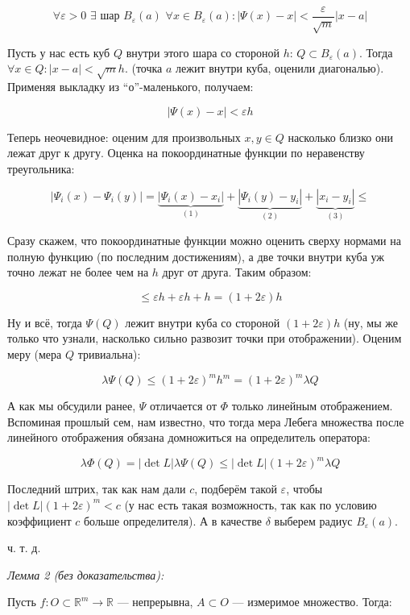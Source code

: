 \documentclass{article}
\def\dbl{\,\,}
\begin{document}
\[\forall \varepsilon > 0 \dbl \exists \text{ шар } B_{\varepsilon}(a) \dbl \forall x \in B_{\varepsilon}(a): |\Psi(x) - x| < \frac{\varepsilon}{\sqrt{m}}|x - a|\]

Пусть у нас есть куб $Q$ внутри этого шара со стороной $h$: $Q \subset B_{\varepsilon}(a)$. Тогда $\forall x \in Q: |x - a| < \sqrt{m}h$. (точка $a$ лежит внутри куба, оценили диагональю). Применяя выкладку из ``о''-маленького, получаем:

\[|\Psi(x) - x| < \varepsilon h\]

Теперь неочевидное: оценим для произвольных $x, y \in Q$ насколько близко они лежат друг к другу. Оценка на покоординатные функции по неравенству треугольника:

\[|\Psi_i(x) - \Psi_i(y)| = \underbrace{|\Psi_i(x) - x_i|}_{(1)} + \underbrace{|\Psi_i(y) - y_i|}_{(2)} + \underbrace{|x_i - y_i|}_{(3)} \le\]

Сразу скажем, что покоординатные функции можно оценить сверху нормами на полную функцию (по последним достижениям), а две точки внутри куба уж точно лежат не более чем на $h$ друг от друга. Таким образом:

\[\le \varepsilon h + \varepsilon h + h = (1 + 2\varepsilon) h \]

Ну и всё, тогда $\Psi(Q)$ лежит внутри куба со стороной $(1 + 2\varepsilon)h$ (ну, мы же только что узнали, насколько сильно развозит точки при отображении). Оценим меру (мера $Q$ тривиальна):

\[\lambda\Psi(Q) \le (1 + 2\varepsilon)^mh^m = (1 + 2\varepsilon)^m\lambda Q\]

А как мы обсудили ранее, $\Psi$ отличается от $\Phi$ только линейным отображением. Вспоминая прошлый сем, нам известно, что тогда мера Лебега множества после линейного отображения обязана домножиться на определитель оператора:

\[\lambda\Phi(Q) = |\det L|\lambda \Psi(Q) \le |\det L|(1 + 2\varepsilon)^m \lambda Q\]

Последний штрих, так как нам дали $c$, подберём такой $\varepsilon$, чтобы $|\det L|(1 + 2\varepsilon)^m < c$ (у нас есть такая возможность, так как по условию коэффициент $c$ больше определителя). А в качестве $\delta$ выберем радиус $B_{\varepsilon}(a)$.

ч. т. д.

\textit{Лемма 2 (без доказательства):}

Пусть $f: O \subset \mathbb{R}^m \rightarrow \mathbb{R}$ --- непрерывна, $A \subset O$ --- измеримое множество. Тогда:
\end{document}

